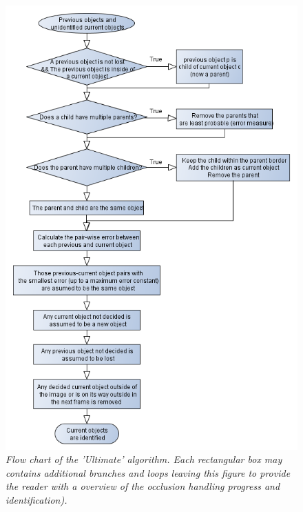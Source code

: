 \newpage
\begin{figure}[htb]
	\centering
	\includegraphics[width=123.5mm]{images/data_flow_identification.png}
	\caption{\textit{Flow chart of the 'Ultimate' algorithm. Each rectangular box may contains additional branches and loops leaving this figure to provide the reader with a overview of the occlusion handling progress and identification).}}
	\label{fig:ObjID_fig} %
\end{figure}
